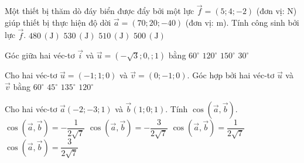 \begin{ex}
	Một thiết bị thăm dò đáy biển được đẩy bởi một lực $\overrightarrow{f} = (5; 4; -2)$ (đơn vị: N) giúp thiết bị thực hiện độ dời $\overrightarrow{a} = (70; 20; -40)$ (đơn vị: m). Tính công sinh bởi lực $\overrightarrow{f}$.
	\choice
	{$480\,(\text{J})$}
	{$530\,(\text{J})$}
	{\True $510\,(\text{J})$}
	{$500\,(\text{J})$}
\end{ex} 

\begin{ex}
	Góc giữa hai véc-tơ $ \vec{i} $ và $ \vec{u}=(-\sqrt{3};0,;1) $ bằng
	\choice
	{$ 60^\circ $}
	{$ 120^\circ $}
	{\True $ 150^\circ $}
	{$ 30^\circ $}
\end{ex} 

\begin{ex}
	Cho hai véc-tơ $ \vec{u}=(-1;1;0) $ và $ \vec{v}=(0;-1;0) $. Góc hợp bởi hai véc-tơ $ \vec{u} $ và $ \vec{v} $ bằng
	\choice
	{$ 60^\circ $}
	{$ 45^\circ $}
	{\True $ 135^\circ $}
	{$ 120^\circ $}
\end{ex} 

\begin{ex}
	Cho hai véc-tơ $ \vec{a}(-2;-3;1) $ và $ \vec{b}(1;0;1) $. Tính $ \cos(\vec{a},\vec{b}) $.
	\choice
	{\True $ \cos(\vec{a},\vec{b})=-\dfrac{1}{2\sqrt{7}} $}
	{$ \cos(\vec{a},\vec{b})=-\dfrac{3}{2\sqrt{7}} $}
	{$ \cos(\vec{a},\vec{b})=\dfrac{1}{2\sqrt{7}} $}
	{$ \cos(\vec{a},\vec{b})=\dfrac{3}{2\sqrt{7}} $}
\end{ex}

